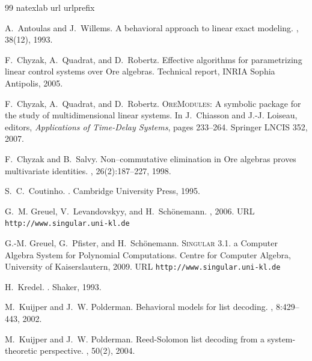 \documentclass[a4paper,10pt]{article}
\theoremstyle{nonumberplain}
\begin{document}
\begin{thebibliography}{99}
\expandafter\ifx\csname natexlab\endcsname\relax\def\natexlab#1{#1}\fi
\expandafter\ifx\csname url\endcsname\relax
  \def\url#1{\texttt{#1}}\fi
\expandafter\ifx\csname urlprefix\endcsname\relax\def\urlprefix{URL }\fi

A.~Antoulas and J.~Willems.
\newblock A behavioral approach to linear exact modeling.
, 38(12), 1993.

F.~Chyzak, A.~Quadrat, and D.~Robertz.
\newblock Effective algorithms for parametrizing linear control systems over
  {O}re algebras.
\newblock Technical report, INRIA Sophia Antipolis, 2005.

F.~Chyzak, A.~Quadrat, and D.~Robertz.
\newblock \textsc{OreModules}: A symbolic package for the study of
  multidimensional linear systems.
\newblock In J.~Chiasson and J.-J. Loiseau, editors, {\em Applications of
  Time-Delay Systems}, pages 233--264. Springer LNCIS 352, 2007.

F.~Chyzak and B.~Salvy.
\newblock Non--commutative elimination in {O}re algebras proves multivariate
  identities.
, 26(2):187--227, 1998.

S.~C.~Coutinho.
.
\newblock Cambridge University Press, 1995.

G.~M. Greuel, V.~Levandovskyy, and H.~Sch{\"o}nemann.
, 2006.
\newblock \urlprefix\url{http://www.singular.uni-kl.de} 

G.-M. Greuel, G.~Pfister, and H.~Sch{\"o}nemann.
\newblock \textsc{Singular} 3.1. a {C}omputer {A}lgebra {S}ystem for
  {P}olynomial {C}omputations. {C}entre for {C}omputer {A}lgebra, {U}niversity
  of {K}aiserslautern, 2009.
\urlprefix\url{http://www.singular.uni-kl.de} 

H.~Kredel.
.
\newblock Shaker, 1993.

M.~Kuijper and J.~W. Polderman.
\newblock Behavioral models for list decoding.
, 8:429--443, 2002.

M.~Kuijper and J.~W. Polderman.
\newblock Reed-{S}olomon list decoding from a system-theoretic perspective.
, 50(2), 2004.


\end{thebibliography}
\end{document}
